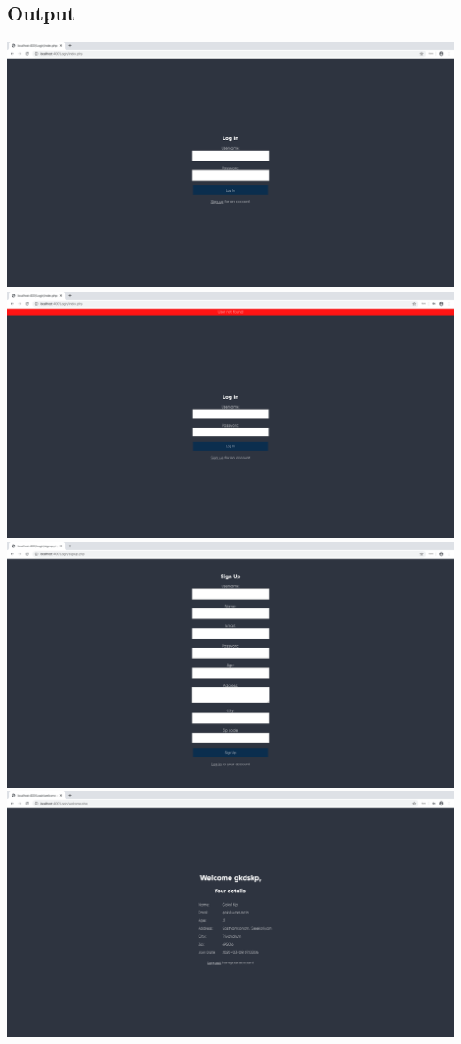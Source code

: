 \documentclass{article}
\begin{document}
\subsection{Output}
\includegraphics[width=1\textwidth]{img/p25/ss1.png}
\includegraphics[width=1\textwidth]{img/p25/ss2.png}
\includegraphics[width=1\textwidth]{img/p25/ss6.png}
\includegraphics[width=1\textwidth]{img/p25/ss4.png}
\end{document}
